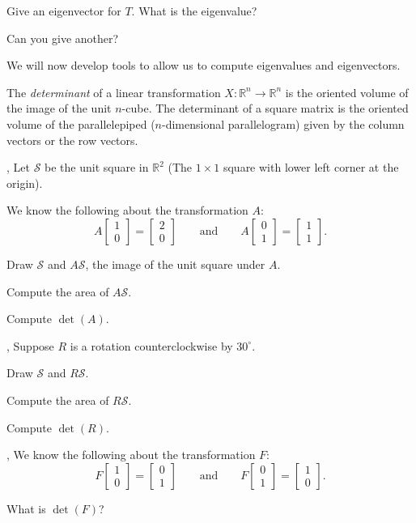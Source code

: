 \documentclass[letter]{article}
\newcommand{\R}{\mathbb{R}}
\newcommand{\mat}[1]{\begin{bmatrix}#1\end{bmatrix}}
\begin{document}
	\begin{Enum}[resume]
		\item Give an eigenvector for $T$.  What is the eigenvalue?
		\item Can you give another?
	\end{Enum}

	We will now develop tools to allow us to compute eigenvalues and eigenvectors.

	\begin{Def}
	The \emph{determinant} of a linear transformation $X:\R^n\to \R^n$ is the 
	oriented volume of the image of the unit $n$-cube.  The determinant
	of a square matrix is the oriented volume of the parallelepiped 
	($n$-dimensional parallelogram) given by the column vectors or the row
	vectors.
	\end{Def}

	\sep
	Let $\mathcal S$ be the unit square in $\R^2$ (The $1\times 1$ square with lower
	left corner at the origin).

	We know the following about the transformation $A$:
	\[
		A\mat{1\\0}=\mat{2\\0}\qquad\text{and}\qquad A\mat{0\\1}=\mat{1\\1}.
	\]
	\begin{Enum}
		\item Draw $\mathcal S$ and $A\mathcal S$, the image of the unit square
			under $A$.
		\item Compute the area of $A\mathcal S$.
		\item Compute $\det(A)$.
	\end{Enum}

	\sep
	Suppose $R$ is a rotation counterclockwise by $30^\circ$.
	\begin{Enum}
		\item Draw $\mathcal S$ and $R\mathcal S$.
		\item Compute the area of $R\mathcal S$.
		\item Compute $\det(R)$.
	\end{Enum}
	
	\sep
	We know the following about the transformation $F$:
	\[
		F\mat{1\\0}=\mat{0\\1}\qquad\text{and}\qquad F\mat{0\\1}=\mat{1\\0}.
	\]
	\begin{Enum}
		\item What is $\det(F)$?
	\end{Enum}
\end{document}
